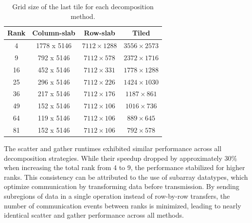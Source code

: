\begin{table}
    \centering
    \begin{tabular}{c|c|c|c}
        \textbf{Rank} & \textbf{Column-slab} & \textbf{Row-slab} & \textbf{Tiled} \\
        \hline
        4  & 1778 x 5146& \(7112 \times 1288\) & \(3556 \times 2573\) \\
        9  & 792 x 5146& \(7112 \times 578\)  & \(2372 \times 1716\) \\
        16 & 452 x 5146& \(7112 \times 331\)  & \(1778 \times 1288\) \\
        25 & 296 x 5146& \(7112 \times 226\)  & \(1424 \times 1030\) \\
        36 & 217 x 5146& \(7112 \times 176\)  & \(1187 \times 861\)  \\
        49 & 152 x 5146& \(7112 \times 106\)  & \(1016 \times 736\)  \\
        64 & 119 x 5146& \(7112 \times 106\)  & \(889 \times 645\)   \\
        81 & 152 x 5146& \(7112 \times 106\)  & \(792 \times 578\)   \\
    \end{tabular}
    \caption{Grid size of the last tile for each decomposition method.}
    \label{tab:last-grid-sizes}
\end{table}


The scatter and gather runtimes exhibited similar performance across all decomposition strategies. While their speedup dropped by approximately 30\% when increasing the total rank from 4 to 9, the performance stabilized for higher ranks. This consistency can be attributed to the use of subarray datatypes, which optimize communication by transforming data before transmission. By sending subregions of data in a single operation instead of row-by-row transfers, the number of communication events between ranks is minimized, leading to nearly identical scatter and gather performance across all methods.